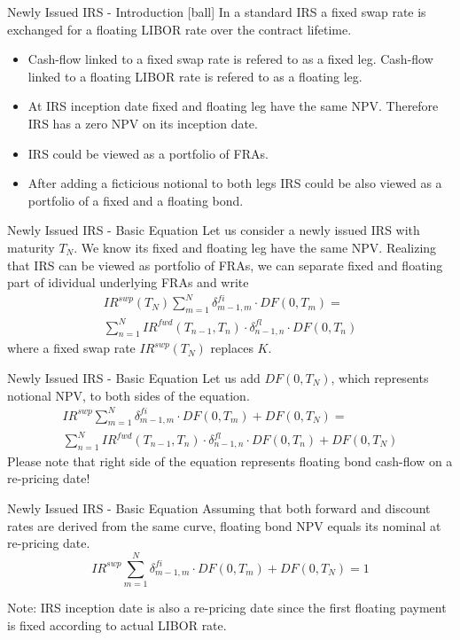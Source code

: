 \documentclass{beamer}
\begin{document}
\begin{frame}{Newly Issued IRS - Introduction}
[ball]
In a standard IRS a fixed swap rate is exchanged for a floating LIBOR rate over the contract lifetime.
\begin{itemize}
\item Cash-flow linked to a fixed swap rate is refered to as a fixed leg. Cash-flow linked to a floating LIBOR rate is refered to as a floating leg.
\item At IRS inception date fixed and floating leg have the same NPV. Therefore IRS has a zero NPV on its inception date.
\item IRS could be viewed as a portfolio of FRAs.
\item After adding a ficticious notional to both legs IRS could be also viewed as a portfolio of a fixed and a floating bond.
\end{itemize}
\end{frame}

\begin{frame}{Newly Issued IRS - Basic Equation}
Let us consider a newly issued IRS with maturity $T_N$. We know its fixed and floating leg have the same NPV. Realizing that IRS can be viewed as portfolio of FRAs, we can separate fixed and floating part of idividual underlying FRAs and write
\begin{multline*}
IR^{swp}(T_N) \sum_{m = 1}^N \delta_{m - 1, m}^{fi} \cdot DF(0, T_m) = \\
\sum_{n = 1}^N IR^{fwd}(T_{n-1}, T_n) \cdot \delta_{n - 1, n}^{fl} \cdot DF(0, T_n)
\end{multline*}
where a fixed swap rate $IR^{swp}(T_N)$ replaces $K$.
\end{frame}

\begin{frame}{Newly Issued IRS - Basic Equation}
Let us add $DF(0, T_N)$, which represents notional NPV, to both sides of the equation.
\begin{multline*}
IR^{swp} \sum_{m = 1}^N \delta_{m - 1, m}^{fi} \cdot DF(0, T_m) + DF(0, T_N) = \\
\sum_{n = 1}^N IR^{fwd}(T_{n-1}, T_n) \cdot \delta_{n - 1, n}^{fl} \cdot DF(0, T_n) + DF(0, T_N)
\end{multline*}
Please note that right side of the equation represents floating bond cash-flow on a re-pricing date!
\end{frame}

\begin{frame}{Newly Issued IRS - Basic Equation}
Assuming that both forward and discount rates are derived from the same curve, floating bond NPV equals its nominal at re-pricing date.
\begin{equation*}
IR^{swp} \sum_{m = 1}^N \delta_{m - 1, m}^{fi} \cdot DF(0, T_m) + DF(0, T_N) = 1
\end{equation*}

Note: IRS inception date is also a re-pricing date since the first floating payment is fixed according to actual LIBOR rate.
\end{frame}
\end{document}
